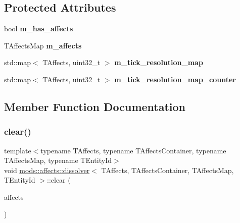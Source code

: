\subsection*{Protected Attributes}
\begin{DoxyCompactItemize}
\item 
\mbox{\label{structmods_1_1affects_1_1dissolver_a8a03e83752f5f01d294d57ec2d9e8344}} 
bool {\bfseries m\+\_\+has\+\_\+affects}
\item 
\mbox{\label{structmods_1_1affects_1_1dissolver_a976c460e0ed659d41379dca152f49078}} 
T\+Affects\+Map {\bfseries m\+\_\+affects}
\item 
\mbox{\label{structmods_1_1affects_1_1dissolver_aaba56d076ddde4721e0378830e76febd}} 
std\+::map$<$ T\+Affects, uint32\+\_\+t $>$ {\bfseries m\+\_\+tick\+\_\+resolution\+\_\+map}
\item 
\mbox{\label{structmods_1_1affects_1_1dissolver_aba2351d57a6d335183c85bf064b6e71c}} 
std\+::map$<$ T\+Affects, uint32\+\_\+t $>$ {\bfseries m\+\_\+tick\+\_\+resolution\+\_\+map\+\_\+counter}
\end{DoxyCompactItemize}


\subsection{Member Function Documentation}
\mbox{\label{structmods_1_1affects_1_1dissolver_adda06b1b31ee9e7a55ac55132321f811}} 
\subsubsection{\texorpdfstring{clear()}{clear()}}
{\footnotesize\ttfamily template$<$typename T\+Affects, typename T\+Affects\+Container, typename T\+Affects\+Map, typename T\+Entity\+Id$>$ \\
void \hyperlink{structmods_1_1affects_1_1dissolver}{mods\+::affects\+::dissolver}$<$ T\+Affects, T\+Affects\+Container, T\+Affects\+Map, T\+Entity\+Id $>$\+::clear (\begin{DoxyParamCaption}\item[{T\+Affects\+Container}]{affects }\end{DoxyParamCaption})\hspace{0.3cm}{\ttfamily [inline]}}

